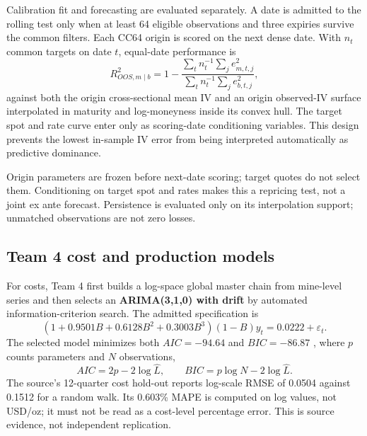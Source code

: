 Calibration fit and forecasting are evaluated separately. A date is admitted to the rolling test only when at least 64 eligible observations and three expiries survive the common filters. Each CC64 origin is scored on the next dense date. With $n_t$ common targets on date $t$, equal-date performance is
\begin{equation}
R^2_{OOS,m\mid b}=1-\frac{\sum_t n_t^{-1}\sum_j e_{m,t,j}^2}{\sum_t n_t^{-1}\sum_j e_{b,t,j}^2},
\label{eq:oos_r2}
\end{equation}
against both the origin cross-sectional mean IV and an origin observed-IV surface interpolated in maturity and log-moneyness inside its convex hull. The target spot and rate curve enter only as scoring-date conditioning variables. This design prevents the lowest in-sample IV error from being interpreted automatically as predictive dominance.

Origin parameters are frozen before next-date scoring; target quotes do not select them. Conditioning on target spot and rates makes this a repricing test, not a joint ex ante forecast. Persistence is evaluated only on its interpolation support; unmatched observations are not zero losses.

\subsection{Team 4 cost and production models}
For costs, Team 4 first builds a log-space global master chain from mine-level series and then selects an \textbf{ARIMA(3,1,0) with drift} by automated information-criterion search. The admitted specification is
\begin{equation}
(1+0.9501B+0.6128B^2+0.3003B^3)(1-B)y_t
=0.0222+\varepsilon_t.
\label{eq:cost_arima}
\end{equation}
The selected model minimizes both $AIC=-94.64$ and $BIC=-86.87$ \citep{akaike1974,schwarz1978}, where $p$ counts parameters and $N$ observations,
\begin{equation}
AIC=2p-2\log\widehat L,\qquad BIC=p\log N-2\log\widehat L.
\label{eq:aicbic}
\end{equation}
The source's 12-quarter cost hold-out reports log-scale RMSE of 0.0504 against 0.1512 for a random walk. Its 0.603\% MAPE is computed on log values, not USD/oz; it must not be read as a cost-level percentage error. This is source evidence, not independent replication.

